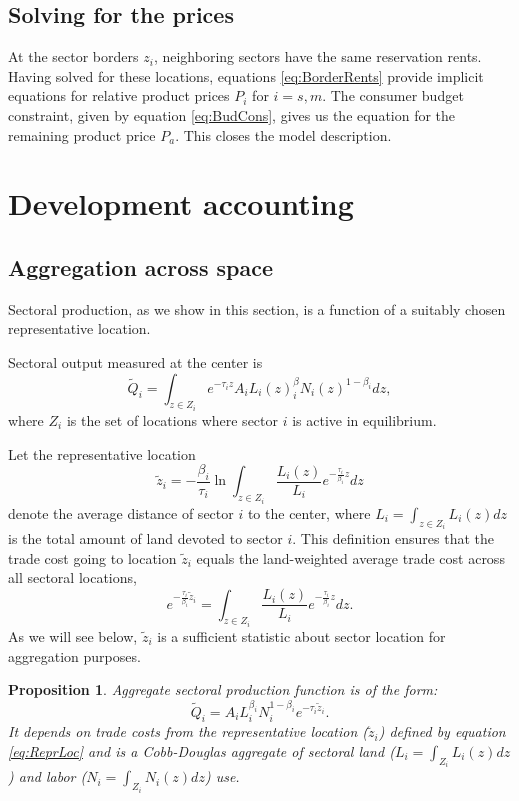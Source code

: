 \documentclass[12pt]{article}
\newtheorem{proposition}{Proposition}
\begin{document}
\subsection{Solving for the prices}

At the sector borders $z_i$, neighboring sectors have the same reservation rents. Having solved for these locations, equations \ref{eq:BorderRents} provide implicit equations for relative product prices $P_i$ for $i=s,m.$ The consumer budget constraint, given by equation \ref{eq:BudCons}, gives us the equation for the remaining product price $P_a$. This closes the model description.   

\section{Development accounting}
\subsection{Aggregation across space}
Sectoral production, as we show in this section, is a function of a suitably chosen representative location. 

Sectoral output measured at the center is
\begin{equation*}
\tilde{Q}_i=\int_{z\in Z_i}e^{-\tau_i z}A_iL_i(z)^\beta_iN_i(z)^{1-\beta_i}dz,
\end{equation*}
where $Z_i$ is the set of locations where sector $i$ is active in equilibrium. 

Let the representative location
\begin{equation}
\label{eq:ReprLoc}
\tilde z_i = -
\frac{\beta_i}{\tau_i}
\ln\int_{z\in Z_i} \frac{L_i(z)}{L_i}e^{-\frac{\tau_i}{\beta_i} z}dz
\end{equation}
denote the average distance of sector $i$ to the center, where $L_i=\int_{z\in Z_i} L_i(z)dz$ is the total amount of land devoted to sector $i$. This definition ensures that the trade cost going to location $\tilde z_i$ equals the land-weighted average trade cost across all sectoral locations,
\[
e^{-\frac{\tau_i}{\beta_i} \tilde z_i} = \int_{z\in Z_i} \frac{L_i(z)}{L_i}e^{-\frac{\tau_i}{\beta_i} z}dz.
\]
As we will see below, $\tilde z_i$ is a sufficient statistic about sector location for aggregation purposes. %

\begin{proposition}
Aggregate sectoral production function is of the form: 
\begin{equation}
\tilde Q_i =
A_iL_i^{\beta_i}N_i^{1-\beta_i}
 e^{-\tau_i\tilde z_i}.
\end{equation}
It depends on trade costs from the representative location ($\tilde{z}_i$) defined by equation \ref{eq:ReprLoc} and is a Cobb-Douglas aggregate of sectoral land ($L_i=\int_{Z_i}L_i(z)dz$) and labor ($N_i=\int_{Z_i}N_i(z)dz$) use.
\end{proposition}
\end{document}
